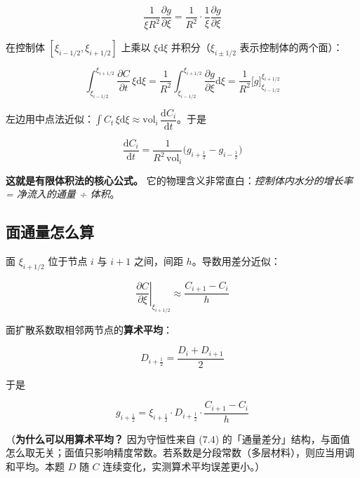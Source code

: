 \begin{equation*}
\frac{1}{\xi R^2}\frac{\partial g}{\partial\xi}=\frac{1}{R^2}\cdot\frac1\xi\frac{\partial g}{\partial\xi}
\end{equation*}


在控制体 $[\xi_{i-1/2},\xi_{i+1/2}]$ 上乘以 $\xi\mathrm{d}\xi$ 并积分（$\xi_{i\pm1/2}$ 表示控制体的两个面）：


\begin{equation}
\int_{\xi_{i-1/2}}^{\xi_{i+1/2}}\frac{\partial C}{\partial t}\,\xi\mathrm{d}\xi
=\frac{1}{R^2}\int_{\xi_{i-1/2}}^{\xi_{i+1/2}}\frac{\partial g}{\partial \xi}\mathrm{d}\xi
=\frac{1}{R^2}\Big[g\Big]_{\xi_{i-1/2}}^{\xi_{i+1/2}}\tag{7.3}
\end{equation}


左边用中点法近似：$\int C_t\,\xi\mathrm{d}\xi\approx \mathrm{vol}_i\,\dfrac{\mathrm{d} C_i}{\mathrm{d} t}$。于是


\begin{equation}
\boxed{\ \frac{\mathrm{d} C_i}{\mathrm{d} t}=\frac{1}{R^2\,\mathrm{vol}_i}\Big(g_{i+\frac12}-g_{i-\frac12}\Big)\ }\tag{7.4}
\end{equation}


\textbf{这就是有限体积法的核心公式。} 它的物理含义非常直白：\emph{控制体内水分的增长率 = 净流入的通量 ÷ 体积}。


\subsection{面通量怎么算}


面 $\xi_{i+1/2}$ 位于节点 $i$ 与 $i+1$ 之间，间距 $h$。导数用差分近似：


\begin{equation}
\left.\frac{\partial C}{\partial\xi}\right|_{\xi_{i+1/2}}\approx\frac{C_{i+1}-C_i}{h}\tag{7.5}
\end{equation}


面扩散系数取相邻两节点的\textbf{算术平均}：


\begin{equation}
D_{i+\frac12}=\frac{D_i+D_{i+1}}2\tag{7.6}
\end{equation}


于是


\begin{equation}
g_{i+\frac12}=\xi_{i+\frac12}\cdot D_{i+\frac12}\cdot\frac{C_{i+1}-C_i}{h}\tag{7.7}
\end{equation}


（\textbf{为什么可以用算术平均？} 因为守恒性来自 (7.4) 的「通量差分」结构，与面值怎么取无关；面值只影响精度常数。若系数是分段常数（多层材料），则应当用调和平均。本题 $D$ 随 $C$ 连续变化，实测算术平均误差更小。）


